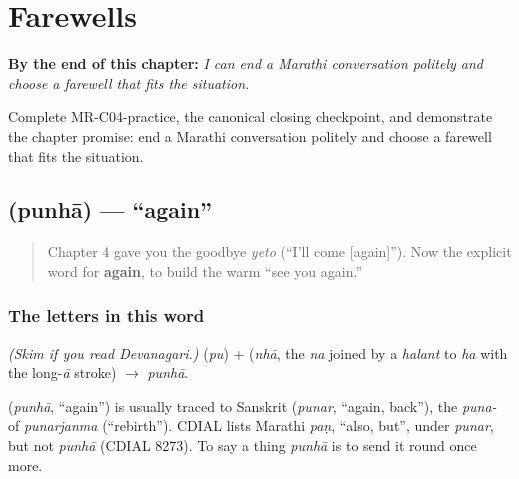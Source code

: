 
\chapter{Farewells}
\label{ch:farewells}

\begin{chapteropening}
\textbf{By the end of this chapter:} \emph{I can end a Marathi conversation politely and choose a farewell that fits the situation.}

Complete MR-C04-practice, the canonical closing checkpoint, and demonstrate the chapter promise: end a Marathi conversation politely and choose a farewell that fits the situation.
\end{chapteropening}

\section[\texorpdfstring{\mr{पुन्हा} (punhā)}{पुन्हा (punhā)}]{ (punhā) — \textquotedblleft{}again\textquotedblright{}}

\label{lesson:MR-C04-punha}



\begin{quote}
Chapter 4 gave you the goodbye \emph{yeto} (\textquotedblleft{}I'll come {[}again{]}\textquotedblright{}). Now the explicit word for \textbf{again}, to build the warm \textquotedblleft{}see you again.\textquotedblright{}
\end{quote}

\subsection*{The letters in this word}
\emph{(Skim if you read Devanagari.)} \textbf{} (\emph{pu}) + \textbf{} (\emph{nhā}, the  \emph{na} joined by a \emph{halant} to  \emph{ha} with the long-\emph{ā} stroke) $\to$ \textbf{} \emph{punhā}.

\begin{cousinweb}
\textbf{} (\emph{punhā}, \textquotedblleft{}again\textquotedblright{}) is usually traced to Sanskrit \textbf{} (\emph{punar}, \textquotedblleft{}again, back\textquotedblright{}), the \emph{puna-} of \emph{punarjanma} (\textquotedblleft{}rebirth\textquotedblright{}). CDIAL lists Marathi \emph{paṇ}, \textquotedblleft{}also, but\textquotedblright{}, under \emph{punar}, but not \emph{punhā} (CDIAL 8273). To say a thing \emph{punhā} is to send it round once more.
\end{cousinweb}

